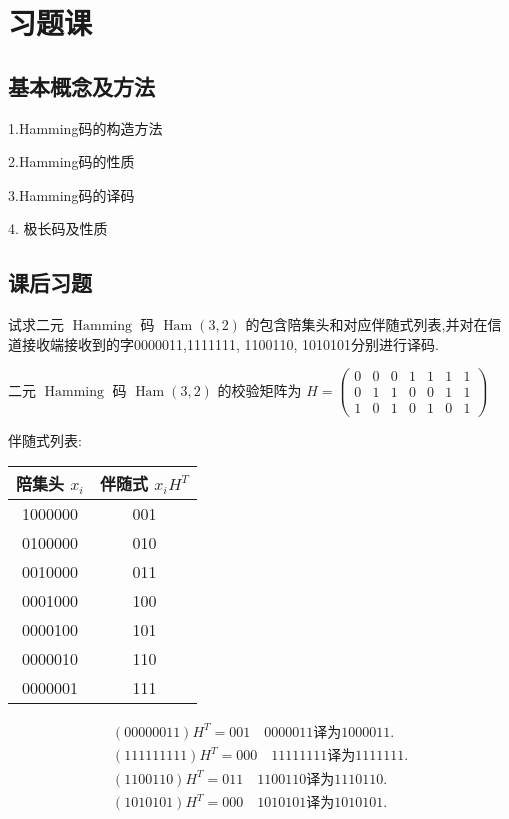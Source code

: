 \section{习题课}
\subsection{基本概念及方法}
1.Hamming码的构造方法

2.Hamming码的性质

3.Hamming码的译码

4. 极长码及性质


\subsection{课后习题}

\begin{exercise}
    试求二元 $ \operatorname{Hamming} $ 码 $ \operatorname{Ham}(3,2) $ 的包含陪集头和对应伴随式列表,并对在信道接收端接收到的字0000011,1111111, 1100110, 1010101分别进行译码.
\end{exercise}
\begin{solution}
    二元 $ \operatorname{Hamming} $ 码 $ \operatorname{Ham}(3,2) $ 的校验矩阵为
$
H=\left(\begin{array}{lllllll}
0 & 0 & 0 & 1 & 1 & 1 & 1 \\
0 & 1 & 1 & 0 & 0 & 1 & 1 \\
1 & 0 & 1 & 0 & 1 & 0 & 1
\end{array}\right)
$

伴随式列表:
\begin{center}
\begin{tabular}{|c|c|}
\hline 陪集头 $ x_{i} $ & 伴随式 $ x_{i} H^{T} $ \\
\hline 1000000 & 001 \\
\hline 0100000 & 010 \\
\hline 0010000 & 011 \\
\hline 0001000 & 100 \\
\hline 0000100 & 101 \\
\hline 0000010 & 110 \\
\hline 0000001 & 111 \\
\hline
\end{tabular}
\end{center}
$$
\begin{gathered}
(00000011)H^T =001\quad0000011\text{译为}1000011. \\
(111111111)H^T =000\quad11111111\text{译为}1111111. \\
(1100110)H^T =011\quad1100110\text{译为}1110110. \\
(1010101)H^T =000\quad1010101\text{译为}1010101. 
\end{gathered}
$$
\end{solution}


